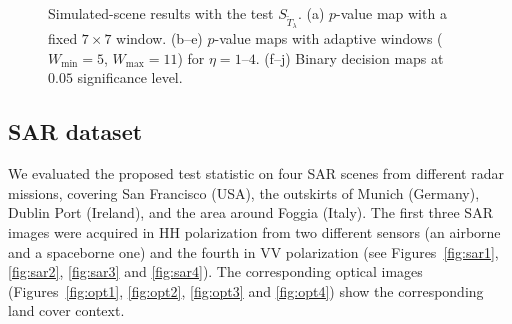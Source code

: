 \documentclass[
  lettersize  journal,
]{IEEEtran}%
\begin{document}
\begin{figure}[!t]
\caption{Simulated-scene results with the test $S_{\widetilde{T}_{\lambda}}$. (a) $p$-value map with a fixed $7\times7$ window. (b–e) $p$-value maps with adaptive windows ($W_{\min}=5$, $W_{\max}=11$) for $\eta=1$--$4$. (f–j) Binary decision maps at $0.05$ significance level.}
\label{fig:grid10}
\end{figure}

\subsection{SAR dataset}\label{sar-dataset}

We evaluated the proposed test statistic on four SAR scenes from
different radar missions, covering San Francisco (USA), the outskirts of
Munich (Germany), Dublin Port (Ireland), and the area around Foggia
(Italy). The first three SAR images were acquired in HH polarization
from two different sensors (an airborne and a spaceborne one) and the
fourth in VV polarization (see Figures~\ref{fig:sar1}, \ref{fig:sar2},
\ref{fig:sar3} and \ref{fig:sar4}). The corresponding optical images
(Figures~\ref{fig:opt1}, \ref{fig:opt2}, \ref{fig:opt3} and
\ref{fig:opt4}) show the corresponding land cover context.

\setlength{\dblfloatsep}{4pt}      
\setlength{\dbltextfloatsep}{4pt}  
\setlength{\textfloatsep}{4pt}
\captionsetup{font=footnotesize}
\captionsetup[sub]{aboveskip=1pt,belowskip=1pt}
\end{document}
